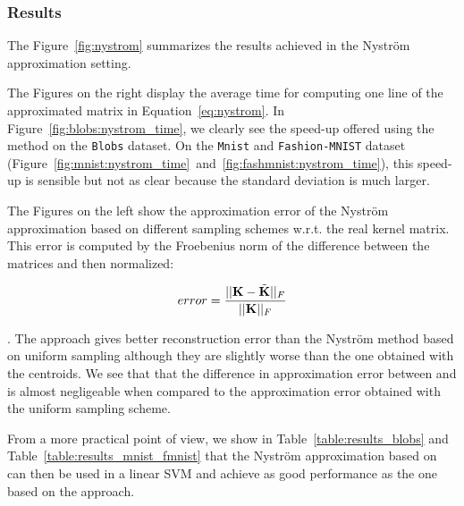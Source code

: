 \subsubsection{Results}

The Figure~\ref{fig:nystrom} summarizes the results achieved in the Nyström approximation setting. 

The Figures on the right display the average time for computing one line of the approximated matrix in Equation~\ref{eq:nystrom}. In Figure~\ref{fig:blobs:nystrom_time}, we clearly see the speed-up offered using the \qkmeans method on the \texttt{Blobs} dataset. On the \texttt{Mnist} and \texttt{Fashion-MNIST} dataset (Figure~\ref{fig:mnist:nystrom_time}~and~\ref{fig:fashmnist:nystrom_time}), this speed-up is sensible but not as clear because the standard deviation is much larger. 

The Figures on the left show the approximation error of the Nyström approximation based on different sampling schemes w.r.t. the real kernel matrix. This error is computed by the Froebenius norm of the difference between the matrices and then normalized:

\begin{equation}
 error = \frac{||{\mathbf{K}} - \tilde{{\mathbf{K}}}||_F}{||{\mathbf{K}}||_F}
\end{equation}

. The \qkmeans approach gives better reconstruction error than the Nyström method based on uniform sampling although they are slightly worse than the one obtained with the \kmeans centroids. We see that that the difference in approximation error between \kmeans and \qkmeans is almost negligeable when compared to the approximation error obtained with the uniform sampling scheme.

From a more practical point of view, we show in Table~\ref{table:results_blobs} and Table~\ref{table:results_mnist_fmnist} that the Nyström approximation based on \qkmeans can then be used in a linear SVM and achieve as good performance as the one based on the \kmeans approach.


